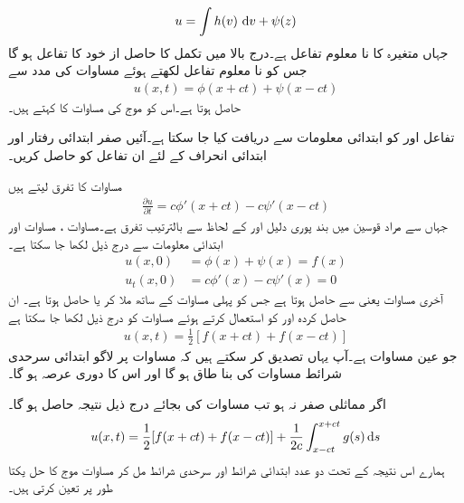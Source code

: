 \begin{align*}
u=\int h(v)\,\dif v+\psi(z)
\end{align*}
جہاں  متغیرہ  کا نا معلوم تفاعل ہے۔درج بالا میں تکمل کا حاصل از خود  کا تفاعل ہو گا جس کو نا معلوم تفاعل   لکھتے ہوئے مساوات  کی مدد سے 
\begin{align}\label{مساوات_جزوی_موج_مساوات_ت}
u(x,t)=\phi(x+ct)+\psi(x-ct)
\end{align}
حاصل ہوتا ہے۔اس کو موج کی مساوات  کا  کہتے ہیں۔

تفاعل  اور  کو ابتدائی معلومات سے دریافت کیا جا سکتا ہے۔آئیں صفر ابتدائی رفتار اور ابتدائی انحراف  کے لئے ان تفاعل کو حاصل کریں۔

مساوات  کا تفرق لیتے ہیں
\begin{align}\label{مساوات_جزوی_موج_مساوات_ٹ}
\frac{\partial u}{\partial t}=c\phi'(x+ct)-c\psi'(x-ct)
\end{align}
جہاں  سے مراد قوسین میں بند پوری دلیل  اور  کے لحاظ سے بالترتیب  تفرق ہے۔مساوات ، مساوات  اور ابتدائی معلومات سے درج ذیل لکھا جا سکتا ہے۔
\begin{align*}
u(x,0)&=\phi(x)+\psi(x)=f(x)\\
u_t(x,0)&=c\phi'(x)-c\psi'(x)=0
\end{align*} 
آخری مساوات یعنی  سے  حاصل ہوتا ہے  جس کو پہلی مساوات کے ساتھ ملا کر  یا  حاصل ہوتا ہے۔ ان حاصل کردہ  اور   کو استعمال کرتے ہوئے مساوات  کو درج ذیل لکھا جا سکتا ہے
\begin{align}\label{مساوات_جزوی_موج_مساوات_ث}
u(x,t)=\frac{1}{2}[f(x+ct)+f(x-ct)]
\end{align}
جو عین مساوات  ہے۔آپ یہاں تصدیق کر سکتے ہیں کہ مساوات  پر لاگو  ابتدائی سرحدی شرائط مساوات  کی بنا  طاق ہو گا اور اس کا دوری عرصہ  ہو گا۔

اگر  مماثلی صفر نہ ہو تب مساوات  کی بجائے درج ذیل نتیجہ  حاصل ہو گا۔
\begin{align}\label{مساوات_جزوی_موج_مساوات_ج}
u(x,t)=\frac{1}{2}[f(x+ct)+f(x-ct)]+\frac{1}{2c}\int_{x-ct}^{x+ct} g(s)\dif s
\end{align}
ہمارے اس نتیجہ کے تحت دو عدد ابتدائی شرائط اور سرحدی شرائط مل کر مساوات موج کا حل یکتا طور پر تعین کرتی ہیں۔ 

